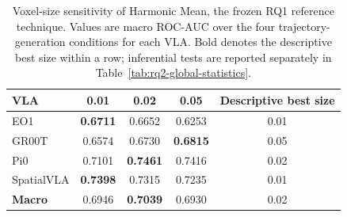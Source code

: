 \begin{table}[t]
\centering
\caption{Voxel-size sensitivity of Harmonic Mean, the frozen RQ1 reference technique. Values are macro ROC-AUC over the four trajectory-generation conditions for each VLA. Bold denotes the descriptive best size within a row; inferential tests are reported separately in Table~\ref{tab:rq2-global-statistics}.}
\label{tab:rq2-reference-by-vla}
\begin{tabular}{lcccc}
\toprule
VLA & 0.01 & 0.02 & 0.05 & Descriptive best size \\
\midrule
EO1 & \textbf{0.6711} & 0.6652 & 0.6253 & 0.01 \\
GR00T & 0.6574 & 0.6730 & \textbf{0.6815} & 0.05 \\
Pi0 & 0.7101 & \textbf{0.7461} & 0.7416 & 0.02 \\
SpatialVLA & \textbf{0.7398} & 0.7315 & 0.7235 & 0.01 \\
\midrule
\textbf{Macro} & 0.6946 & \textbf{0.7039} & 0.6930 & 0.02 \\
\bottomrule
\end{tabular}
\end{table}
